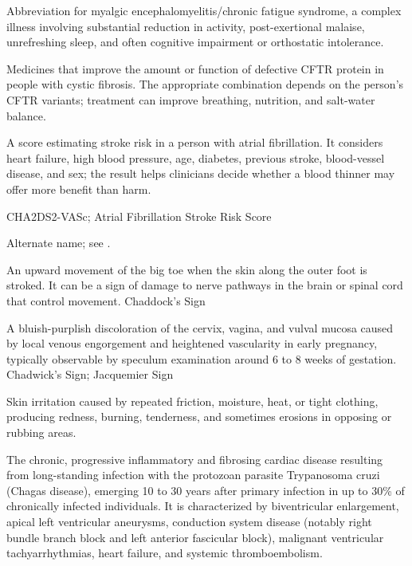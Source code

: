  Abbreviation for myalgic encephalomyelitis/chronic fatigue syndrome, a complex illness involving substantial reduction in activity, post-exertional malaise, unrefreshing sleep, and often cognitive impairment or orthostatic intolerance.

 Medicines that improve the amount or function of defective CFTR protein in people with cystic fibrosis. The appropriate combination depends on the person's CFTR variants; treatment can improve breathing, nutrition, and salt-water balance.

 A score estimating stroke risk in a person with atrial fibrillation. It considers heart failure, high blood pressure, age, diabetes, previous stroke, blood-vessel disease, and sex; the result helps clinicians decide whether a blood thinner may offer more benefit than harm.

\synonyms
CHA2DS2-VASc; Atrial Fibrillation Stroke Risk Score

 Alternate name; see .

 An upward movement of the big toe when the skin
along the outer foot is stroked. It can be a sign of damage to nerve pathways
in the brain or spinal cord that control movement.
\synonyms
Chaddock's Sign

 A bluish-purplish discoloration of the cervix, vagina, and vulval mucosa caused by local venous engorgement and heightened vascularity in early pregnancy, typically observable by speculum examination around 6 to 8 weeks of gestation.
\synonyms
Chadwick's Sign; Jacquemier Sign

 Skin irritation caused by repeated friction, moisture, heat, or tight clothing, producing redness, burning, tenderness, and sometimes erosions in opposing or rubbing areas.

 The chronic, progressive inflammatory and fibrosing cardiac disease resulting from long-standing infection with the protozoan parasite Trypanosoma cruzi (Chagas disease), emerging 10 to 30 years after primary infection in up to 30\% of chronically infected individuals. It is characterized by biventricular enlargement, apical left ventricular aneurysms, conduction system disease (notably right bundle branch block and left anterior fascicular block), malignant ventricular tachyarrhythmias, heart failure, and systemic thromboembolism.

